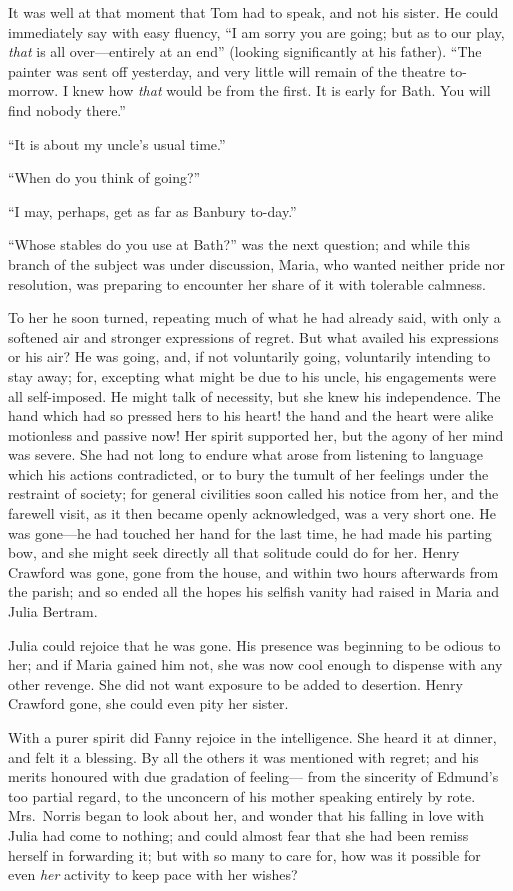It was well at that moment that Tom had to speak, and not
his sister.  He could immediately say with easy fluency,
``I am sorry you are going; but as to our play, \emph{that} is
all over---entirely at an end'' (looking significantly
at his father). ``The painter was sent off yesterday,
and very little will remain of the theatre to-morrow. I knew
how \emph{that} would be from the first.  It is early for Bath.
You will find nobody there.''

``It is about my uncle's usual time.''

``When do you think of going?''

``I may, perhaps, get as far as Banbury to-day.''

``Whose stables do you use at Bath?'' was the next question;
and while this branch of the subject was under discussion,
Maria, who wanted neither pride nor resolution, was preparing
to encounter her share of it with tolerable calmness.

To her he soon turned, repeating much of what he had
already said, with only a softened air and stronger
expressions of regret.  But what availed his expressions
or his air?  He was going, and, if not voluntarily going,
voluntarily intending to stay away; for, excepting what might
be due to his uncle, his engagements were all self-imposed.
He might talk of necessity, but she knew his independence.
The hand which had so pressed hers to his heart! the hand
and the heart were alike motionless and passive now!
Her spirit supported her, but the agony of her mind was severe.
She had not long to endure what arose from listening
to language which his actions contradicted, or to bury
the tumult of her feelings under the restraint of society;
for general civilities soon called his notice from her,
and the farewell visit, as it then became openly acknowledged,
was a very short one.  He was gone---he had touched her
hand for the last time, he had made his parting bow,
and she might seek directly all that solitude could do
for her.  Henry Crawford was gone, gone from the house,
and within two hours afterwards from the parish;
and so ended all the hopes his selfish vanity had raised
in Maria and Julia Bertram.

Julia could rejoice that he was gone.  His presence was
beginning to be odious to her; and if Maria gained him not,
she was now cool enough to dispense with any other revenge.
She did not want exposure to be added to desertion.
Henry Crawford gone, she could even pity her sister.

With a purer spirit did Fanny rejoice in the intelligence.
She heard it at dinner, and felt it a blessing.
By all the others it was mentioned with regret;
and his merits honoured with due gradation of feeling---%
from the sincerity of Edmund's too partial regard,
to the unconcern of his mother speaking entirely by rote.
Mrs.\ Norris began to look about her, and wonder that
his falling in love with Julia had come to nothing;
and could almost fear that she had been remiss herself
in forwarding it; but with so many to care for, how was
it possible for even \emph{her} activity to keep pace with
her wishes?


